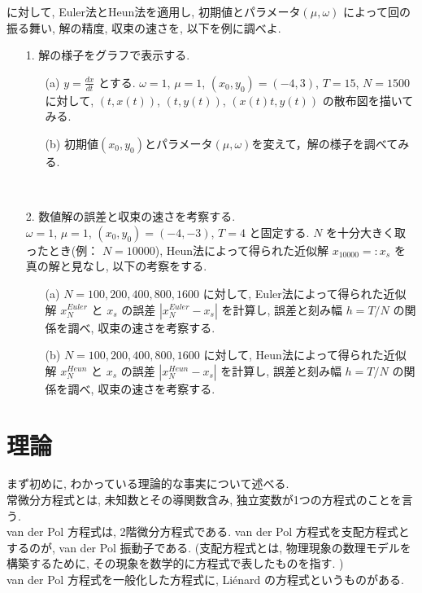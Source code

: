 \documentclass[11pt]{jsarticle}
\begin{document}
に対して, Euler法とHeun法を適用し, 初期値とパラメータ$(\mu, \omega)$ によって回の振る舞い, 解の精度, 収束の速さを, 以下を例に調べよ. 
\ \\
\begin{itemize}
\item[1.] 解の様子をグラフで表示する. 
	\begin{itemize}
	\item[(a)] $\displaystyle y = \frac{dx}{dt}$ とする. $\omega = 1$, $\mu = 1$, $(x_{0}, y_{0}) = (-4, 3)$, $T = 15$, $N = 1500$ に対して, $(t, x(t))$, $(t, y(t))$, $(x(t)t, y(t))$ の散布図を描いてみる. 
	\item[(b)] 初期値$(x_{0},y_{0})$とパラメータ$(\mu,\omega)$を変えて，解の様子を調べてみる.
	\end{itemize}
\ \\
\item[2.] 数値解の誤差と収束の速さを考察する. \\
	$\omega = 1$, $\mu = 1$, $(x_{0}, y_{0}) = (-4, -3)$, $T = 4$ と固定する. $N$ を十分大きく取ったとき(例： $N = 10000$), Heun法によって得られた近似解 $x_{10000} =: x_{s}$ を真の解と見なし, 以下の考察をする.
	\begin{itemize}
	\item[(a)] $N = 100, 200, 400, 800, 1600$ に対して, Euler法によって得られた近似解 $x^{Euler}_{N}$ と $x_{s}$ の誤差 $|x^{Euler}_{N} - x_{s}|$ を計算し, 誤差と刻み幅 $h = T/N$ の関係を調べ, 収束の速さを考察する.
	\item[(b)] $N = 100, 200, 400, 800, 1600$ に対して, Heun法によって得られた近似解 $x^{Heun}_{N}$ と $x_{s}$ の誤差 $|x^{Heun}_{N} - x_{s}|$ を計算し, 誤差と刻み幅 $h = T/N$ の関係を調べ, 収束の速さを考察する.
	\end{itemize}
\end{itemize}



\section{理論}
まず初めに, わかっている理論的な事実について述べる. \\
常微分方程式とは, 未知数とその導関数含み, 独立変数が1つの方程式のことを言う. \\
van der Pol 方程式は, 2階微分方程式である. van der Pol 方程式を支配方程式とするのが, van der Pol 振動子である. (支配方程式とは, 物理現象の数理モデルを構築するために, その現象を数学的に方程式で表したものを指す. ) \\
van der Pol 方程式を一般化した方程式に, Li\'{e}nard の方程式というものがある. \\
\end{document}
